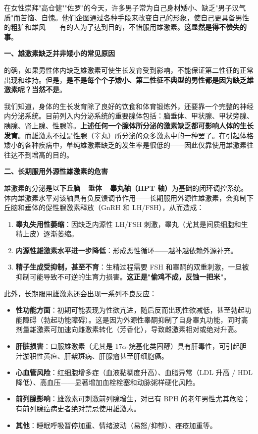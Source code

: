 在女性崇拜"高仓健""佐罗"的今天，许多男子常为自己身材矮小、缺乏"男子汉气质"而苦恼、自愧。他们企图通过各种手段来改变自己的形象，使自己更具备男性的粗犷和雄风——有的人为了达到目的，不惜服用雄激素。\textbf{这显然是得不偿失的事}。

\vspace{0.5em}
\noindent\textbf{一、雄激素缺乏并非矮小的常见原因}

的确，如果男性体内缺乏雄激素可使生长发育受到影响，不能保证第二性征的正常出现和维持。但是，\textbf{是不是每个个子矮小、第二性征不典型的男性都是因为缺乏雄激素呢？当然不是}。

我们知道，身体的生长发育除了良好的饮食和体育锻炼外，还要靠一个完整的神经内分泌系统。目前列入内分泌系统的重要腺体包括：脑垂体、甲状腺、甲状旁腺、胰腺、肾上腺、性腺等。\textbf{上述任何一个腺体所分泌的激素缺乏都可影响人体的生长发育}。而雄激素不过是性腺（睾丸）所分泌的众多激素中的一种罢了。在引起体格矮小的各种疾病中，单纯雄激素缺乏的发生率是很低的——因此仅靠使用雄激素往往达不到增高的目的。

\vspace{0.5em}
\noindent\textbf{二、长期服用外源性雄激素的危害}

雄激素的分泌是以\textbf{下丘脑—垂体—睾丸轴（HPT 轴）}为基础的闭环调控系统。体内雄激素水平对该轴具有负反馈调节作用——长期服用外源性雄激素，会抑制下丘脑和垂体的促性腺激素释放（GnRH 和 LH/FSH），从而造成：

\begin{enumerate}
	\item \textbf{睾丸失用性萎缩}：因缺乏内源性 LH/FSH 刺激，睾丸（尤其是间质细胞和生精上皮）逐渐萎缩。
	\item \textbf{内源性雄激素水平进一步降低}：形成恶性循环——越补越依赖外源补充。
	\item \textbf{精子生成受抑制，甚至不育}：生精过程需要 FSH 和睾酮的双重刺激，一旦被抑制可能导致不可逆的生育力损害。\textbf{这正是"偷鸡不成，反蚀一把米"}。
\end{enumerate}

此外，长期服用雄激素还会出现一系列不良反应：
\begin{itemize}
	\item \textbf{性功能方面}：初期可能表现为性欲亢进，随后反而出现性欲减低，甚至勃起功能障碍（勃起功能障碍）。这是因为外源性睾酮抑制了自身睾丸功能，同时高剂量雄激素可加速向雌激素转化（芳香化），导致雌激素相对或绝对升高。
	\item \textbf{肝脏损害}：口服雄激素（尤其是 $17\alpha$-烷基化类固醇）具有肝毒性，可引起胆汁淤积性黄疸、肝紫斑病、肝腺瘤甚至肝细胞癌。
	\item \textbf{心血管风险}：红细胞增多症（血液黏稠度升高）、血脂异常（LDL 升高 / HDL 降低）、高血压——显著增加血栓栓塞和动脉粥样硬化风险。
	\item \textbf{前列腺影响}：雄激素可刺激前列腺增生，对已有 BPH 的老年男性尤其危险；有前列腺癌病史者绝对禁忌使用雄激素。
	\item \textbf{其他}：睡眠呼吸暂停加重、情绪波动（易怒/抑郁）、痤疮加重等。
\end{itemize}

